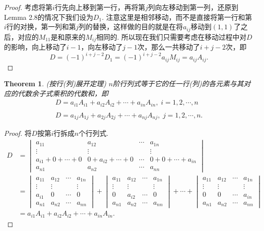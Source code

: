 \documentclass{article}
\newtheorem{theorem}{Theorem}[section]
\begin{document}
\begin{proof}
考虑将第$i$行先向上移到第一行，再将第$j$列向左移动到第一列，还原到Lemma 2.8的情况下我们设为$D_1$. {\color{blue}注意这里是相邻移动，而不是直接将第一行和第$i$行的对换，第一列和第$j$列的替换，这样做的目的就是在将$a_{ij}$移动到$(1,1)$了之后，对应的$M_{11}$是和原来的$M_{ij}$相同的}. 所以现在我们只需要考虑在移动过程中对$D$的影响，向上移动了$i-1$，向左移动了$j-1$次，那么一共移动了$i+j-2$次，即
$$
D = (-1)^{i+j-2}D_1  = (-1)^{i+j-2} a_{ij}M_{ij} = a_{ij}A_{ij}.  
$$
\end{proof}

\begin{theorem}
\rm {\color{red} (按行(列)展开定理)} $n$阶行列式等于它的任一行(列)的各元素与其对应的代数余子式乘积的代数和，即
$$
\begin{array}{ll}
D = a_{i1}A_{i1} + a_{i2}A_{i2} + \cdots + a_{in}A_{in}, \; i=1,2,\cdots,n\\ \\
D = a_{1j}A_{1j} + a_{2j}A_{2j} + \cdots + a_{nj}A_{nj}, \; j=1,2,\cdots,n. 
\end{array}
$$
\end{theorem}

\begin{proof}
将$D$按第$i$行拆成$n$个行列式.
$$
\begin{array}{ll}
D &= \begin{vmatrix}
a_{11} & a_{12} & \cdots & a_{1n} \\
\vdots & \vdots & &\vdots \\
a_{i1}+0+\cdots+0 & 0+a_{i2}+\cdots+0 & \cdots & 0+0+\cdots+a_{in}\\
a_{n1} & a_{n2} &  \cdots & a_{nn} 
\end{vmatrix} \\
&= \begin{vmatrix}
a_{11} & a_{12} & \cdots & a_{1n} \\
\vdots & \vdots & &\vdots \\
a_{i1} & 0 & \cdots & 0\\
a_{n1} & a_{n2} &  \cdots & a_{nn} 
\end{vmatrix}
+ \begin{vmatrix}
a_{11} & a_{12} & \cdots & a_{1n} \\
\vdots & \vdots & &\vdots \\
0 & a_{i2} & \cdots & 0\\
a_{n1} & a_{n2} &  \cdots & a_{nn} 
\end{vmatrix}
+ \cdots 
+ \begin{vmatrix}
a_{11} & a_{12} & \cdots & a_{1n} \\
\vdots & \vdots & &\vdots \\
0 & 0 & \cdots & a_{in}\\
a_{n1} & a_{n2} &  \cdots & a_{nn} 
\end{vmatrix} \\
&= a_{i1}A_{i1} + a_{i2}A_{i2} + \cdots + a_{in}A_{in}.
\end{array}
$$
\end{proof}
\end{document}
